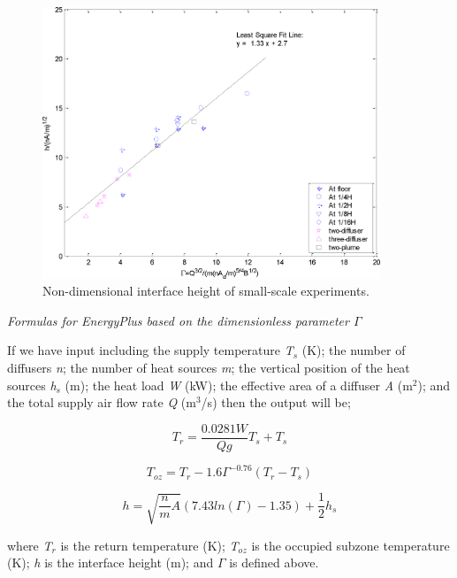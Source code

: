 {\begin{figure}[hbtp] %
\centering
\includegraphics[width=0.9\textwidth, height=0.9\textheight, keepaspectratio=true]{media/image2474.png}
\caption{Non-dimensional interface height of small-scale experiments. \protect \label{fig:non-dimensional-interface-height-of-small}}
\end{figure}

\emph{Formulas for EnergyPlus based on the dimensionless parameter \(\Gamma\)}

If we have input including the supply temperature \emph{T\(_{s}\)} (K); the number of diffusers \emph{n}; the number of heat sources \emph{m}; the vertical position of the heat sources \emph{h\(_{s}\)} (m); the heat load \emph{W} (kW); the effective area of a diffuser \emph{A} (m\(^{2}\)); and the total supply air flow rate \emph{Q} (m\(^{3}\)/s) then the output will be;

\begin{equation}
{T_r} = \frac{{0.0281W}}{{Qg}}{T_s} + {T_s}
\end{equation}

\begin{equation}
{T_{oz}} = {T_r} - 1.6{\Gamma ^{ - 0.76}}({T_r} - {T_s})
\end{equation}

\begin{equation}
h = \sqrt {\frac{n}{m}A} (7.43ln(\Gamma ) - 1.35) + \frac{1}{2}{h_s}
\label{eq:InterfaceHeightEquation}
\end{equation}

where \emph{T\(_{r}\)} is the return temperature (K); \emph{T\(_{oz}\)} is the occupied subzone temperature (K); \emph{h} is the interface height (m); and \emph{\(\Gamma\)} is defined above.

}
